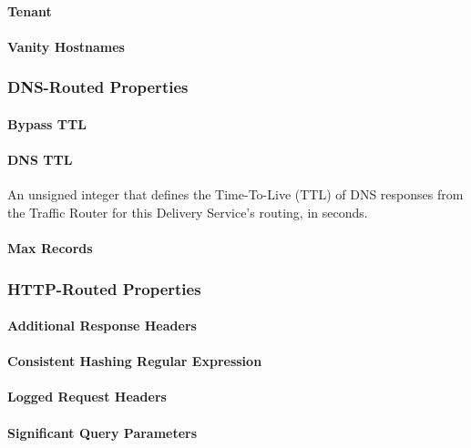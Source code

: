 \paragraph{Tenant}

\paragraph{Vanity Hostnames}

\subsubsection{DNS-Routed Properties}

\paragraph{Bypass TTL}

\paragraph{DNS TTL}
An unsigned integer that defines the Time-To-Live (TTL) of DNS responses from the Traffic Router for this Delivery Service's routing, in seconds.

\paragraph{Max Records}

\subsubsection{HTTP-Routed Properties}

\paragraph{Additional Response Headers}

\paragraph{Consistent Hashing Regular Expression}

\paragraph{Logged Request Headers}

\paragraph{Significant Query Parameters}

